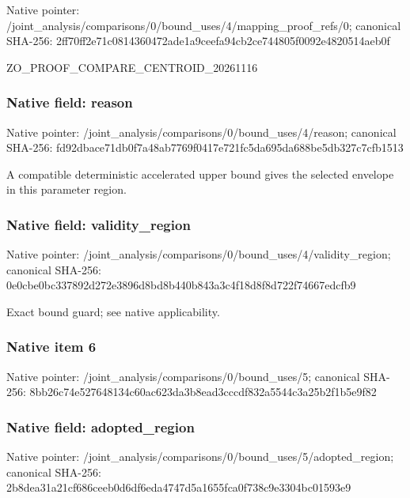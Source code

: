 \documentclass[10pt,a4paper]{article}
\begin{document}
Native pointer: /joint\_analysis/comparis\allowbreak{}ons/0/bound\_uses/4/mappi\allowbreak{}ng\_proof\_refs/0; canonical SHA-256: 2ff70ff2e71c0814360472ad\allowbreak{}e1a9ceefa94cb2ce744805f0\allowbreak{}092e4820514aeb0f


ZO\_PROOF\_COMPARE\_CENTROID\_20261116


\subsubsection{Native field: reason}


Native pointer: /joint\_analysis/comparis\allowbreak{}ons/0/bound\_uses/4/reaso\allowbreak{}n; canonical SHA-256: fd92dbace71db0f7a48ab776\allowbreak{}9f0417e721fc5da695da688b\allowbreak{}e5db327c7cfb1513


A compatible deterministic accelerated upper bound gives the selected envelope in this parameter region.


\subsubsection{Native field: validity\_region}


Native pointer: /joint\_analysis/comparis\allowbreak{}ons/0/bound\_uses/4/valid\allowbreak{}ity\_region; canonical SHA-256: 0e0cbe0bc337892d272e3896\allowbreak{}d8bd8b440b843a3c4f18d8f8\allowbreak{}d722f74667edcfb9


Exact bound guard; see native applicability.


\subsubsection{Native item 6}


Native pointer: /joint\_analysis/comparis\allowbreak{}ons/0/bound\_uses/5; canonical SHA-256: 8bb26c74e527648134c60ac6\allowbreak{}23da3b8ead3cccdf832a5544\allowbreak{}c3a25b2f1b5e9f82



\subsubsection{Native field: adopted\_region}


Native pointer: /joint\_analysis/comparis\allowbreak{}ons/0/bound\_uses/5/adopt\allowbreak{}ed\_region; canonical SHA-256: 2b8dea31a21cf686ceeb0d6d\allowbreak{}f6eda4747d5a1655fca0f738\allowbreak{}c9e3304bc01593e9
\end{document}
